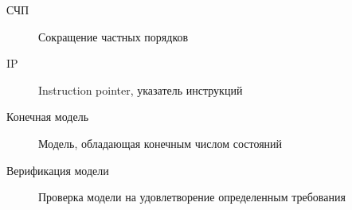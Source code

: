 \Abbreviations
\begin{description}
\item[СЧП] Сокращение частных порядков
\item[IP] Instruction pointer, указатель инструкций
\end{description}

\Defines
\begin{description}
\item[Конечная модель] Модель, обладающая конечным числом состояний
\item[Верификация модели] Проверка модели на удовлетворение
  определенным требования
\end{description}

